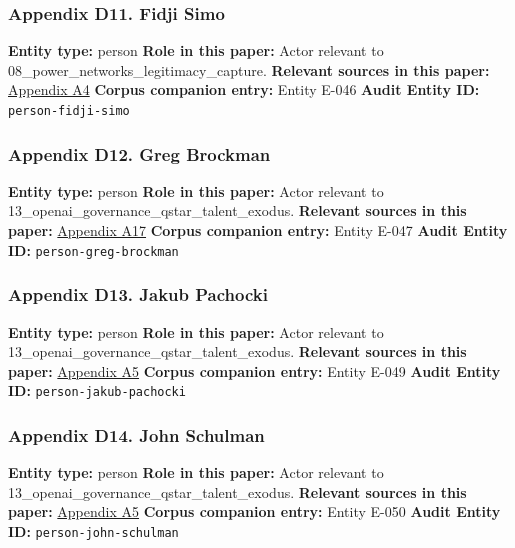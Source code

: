 \documentclass[
  american,
  11pt,
  letterpaper,
]{article}
\begin{document}
\subsubsection{Appendix D11. Fidji
Simo}\label{ch-08-appendix-d11-fidji-simo}

\textbf{Entity type:} person \textbf{Role in this paper:} Actor relevant
to 08\_power\_networks\_legitimacy\_capture. \textbf{Relevant sources in
this paper:}
\hyperref[ch-08-appendix-a4-openai-announces-new-members-to-board-of-directors]{Appendix
A4} \textbf{Corpus companion entry:} Entity E-046 \textbf{Audit Entity
ID:} \texttt{person-fidji-simo}

\subsubsection{Appendix D12. Greg
Brockman}\label{ch-08-appendix-d12-greg-brockman}

\textbf{Entity type:} person \textbf{Role in this paper:} Actor relevant
to 13\_openai\_governance\_qstar\_talent\_exodus. \textbf{Relevant
sources in this paper:}
\hyperref[ch-08-appendix-a17-musk-v-altman-4-24-cv-04722]{Appendix A17}
\textbf{Corpus companion entry:} Entity E-047 \textbf{Audit Entity ID:}
\texttt{person-greg-brockman}

\subsubsection{Appendix D13. Jakub
Pachocki}\label{ch-08-appendix-d13-jakub-pachocki}

\textbf{Entity type:} person \textbf{Role in this paper:} Actor relevant
to 13\_openai\_governance\_qstar\_talent\_exodus. \textbf{Relevant
sources in this paper:}
\hyperref[ch-08-appendix-a5-openai-board-forms-safety-and-security-committee]{Appendix
A5} \textbf{Corpus companion entry:} Entity E-049 \textbf{Audit Entity
ID:} \texttt{person-jakub-pachocki}

\subsubsection{Appendix D14. John
Schulman}\label{ch-08-appendix-d14-john-schulman}

\textbf{Entity type:} person \textbf{Role in this paper:} Actor relevant
to 13\_openai\_governance\_qstar\_talent\_exodus. \textbf{Relevant
sources in this paper:}
\hyperref[ch-08-appendix-a5-openai-board-forms-safety-and-security-committee]{Appendix
A5} \textbf{Corpus companion entry:} Entity E-050 \textbf{Audit Entity
ID:} \texttt{person-john-schulman}
\end{document}
